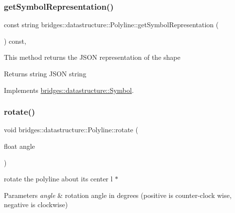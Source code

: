 \subsubsection{\texorpdfstring{get\+Symbol\+Representation()}{getSymbolRepresentation()}}
{\footnotesize\ttfamily const string bridges\+::datastructure\+::\+Polyline\+::get\+Symbol\+Representation (\begin{DoxyParamCaption}{ }\end{DoxyParamCaption}) const\hspace{0.3cm}{\ttfamily [inline]}, {\ttfamily [virtual]}}

This method returns the J\+S\+ON representation of the shape

\begin{DoxyReturn}{Returns}
string J\+S\+ON string 
\end{DoxyReturn}


Implements \hyperlink{classbridges_1_1datastructure_1_1_symbol_a8044b3da559dcd9de8510ae339f126c8}{bridges\+::datastructure\+::\+Symbol}.

\mbox{\label{classbridges_1_1datastructure_1_1_polyline_aa61978ccbb0b086dc8f55e90ccca23c9}} 
\subsubsection{\texorpdfstring{rotate()}{rotate()}}
{\footnotesize\ttfamily void bridges\+::datastructure\+::\+Polyline\+::rotate (\begin{DoxyParamCaption}\item[{float}]{angle }\end{DoxyParamCaption})\hspace{0.3cm}{\ttfamily [inline]}}



rotate the polyline about its center l $\ast$ 


\begin{DoxyParams}{Parameters}
{\em angle} & rotation angle in degrees (positive is counter-\/clock wise, negative is clockwise) \\
\hline
\end{DoxyParams}
\mbox{\label{classbridges_1_1datastructure_1_1_polyline_adf06f484d9a48960de84ed3646903f3a}} 
